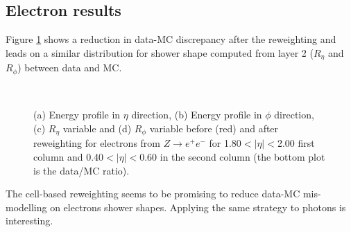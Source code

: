 \subsection{Electron results}
Figure \ref{fig:gamma:ss:reweighting:electron} shows a reduction in data-MC discrepancy after the reweighting and leads on a similar distribution for shower shape computed from layer 2 ($R_{\eta}$ and $R_{\phi}$) between data and MC.
\begin{figure}[ht]
    \centering
     \\
    \caption{(a) Energy profile in $\eta$ direction, (b) Energy profile in $\phi$ direction, (c) $R_{\eta}$ variable and (d) $R_{\phi}$ variable before (red) and after reweighting for electrons from $Z\rightarrow e^+e^-$ for 1.80$<|\eta|<$2.00 first column and 0.40$<|\eta|<$0.60 in the second column (the bottom plot is the data/MC ratio).}
    \label{fig:gamma:ss:reweighting:electron}
\end{figure}
The cell-based reweighting seems to be promising to reduce data-MC mis-modelling on electrons shower shapes. Applying the same strategy to photons is interesting. 
